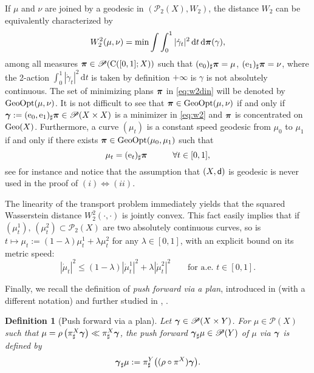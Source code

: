 \documentclass[reqno,11pt]{article}
\numberwithin{equation}{section}
\newcommand{\ggamma}{{\mbox{\boldmath$\gamma$}}}
\newcommand{\ppi}{{\mbox{\boldmath$\pi$}}}
\newcommand{\sfd}{{\sf d}}
\renewcommand{\d}{{\mathrm d}}
\newcommand{\dt}{{\d t}}
\newcommand{\Probabilities}[1]{\mathscr P(#1)}          %
\newcommand{\ProbabilitiesTwo}[1]{\mathscr P_2(#1)}     %
\newtheorem{definition}[theorem]{Definition}
\newcommand{\prob}{\Probabilities}
\newcommand{\probt}{\ProbabilitiesTwo}
\newcommand{\geo}{{\rm{Geo}}}                       %
\newcommand{\e}{{\rm{e}}}                           %
\newcommand{\gopt}{{\rm{GeoOpt}}}                   %
\newcommand{\CC}[2]{\mathrm{C}(#1;#2)}
\begin{document}
If $\mu$ and $\nu$ are joined by a geodesic in $(\probt X,W_2)$, the
distance $W_2$ can be equivalently characterized by
\begin{equation}
\label{eq:w2din} W_2^2(\mu,\nu)=\min\int\int_0^1|\dot\gamma_t|^2\,\d
t\,\d\ppi(\gamma),
\end{equation}
among all measures $\ppi\in\prob{\CC{[0,1]}X}$ such that
$(\e_0)_\sharp \ppi=\mu$, $(\e_1)_\sharp\ppi=\nu$, where the
2-action $\int_0^1|\dot\gamma_t|^2\,\dt$ is taken by definition
$+\infty$ is $\gamma$ is not absolutely continuous. The set of
minimizing plans $\ppi$ in \eqref{eq:w2din} will be denoted by
$\gopt(\mu,\nu)$. It is not difficult to see that
$\ppi\in\gopt(\mu,\nu)$ if and only if
$\ggamma:=(\e_0,\e_1)_\sharp\ppi\in\prob{X\times X}$ is a minimizer
in \eqref{eq:w2} and $\ppi$ is concentrated on $\geo(X)$.
Furthermore, a curve $(\mu_t)$ is a constant speed geodesic from
$\mu_0$ to $\mu_1$ if and only if there exists
$\ppi\in\gopt(\mu_0,\mu_1)$ such that
\[
\mu_t=(\e_t)_\sharp\ppi\qquad\quad\forall t\in [0,1],
\]
see for instance \cite[Theorem~2.10]{Ambrosio-Gigli11} and notice
that the assumption that $(X,\sfd)$ is geodesic is never used in the
proof of $(i)\Leftrightarrow (ii)$.

The linearity of the transport problem immediately yields that the
squared Wasserstein distance $W_2^2(\cdot,\cdot)$ is jointly convex.
This fact easily implies that if $(\mu^1_t),\,(\mu^2_t)\subset\probt
X$ are two absolutely continuous curves, so is
$t\mapsto\mu_t:=(1-\lambda)\mu^1_t+\lambda\mu^2_t$ for any
$\lambda\in [0,1]$, with an explicit bound on its metric speed:
\begin{equation}
\label{eq:convw2}
|\dot\mu_t|^2\leq(1-\lambda)|\dot\mu^1_t|^2+\lambda|\dot\mu^2_t|^2\qquad\text{for
a.e. $t\in [0,1]$.}
\end{equation}

Finally, we recall the definition of \emph{push forward via a plan}, introduced in \cite{Sturm06I}
(with a different notation) and further studied in \cite{Gigli10}, \cite{Ambrosio-Gigli-Savare11}.

\begin{definition}[Push forward via a plan]\label{def:pushplan}
Let $\ggamma\in\prob{X\times Y}$. For $\mu\in\prob X$ such that
$\mu=\rho\,\big(\pi^X_\sharp\ggamma\big)\ll\pi^X_\sharp\ggamma$, the
push forward $\ggamma_\sharp\mu\in\prob Y$ of $\mu$ via $\ggamma$ is
defined by
$$\ggamma_\sharp\mu:=\pi^Y_\sharp\big((\rho\circ\pi^X)\ggamma\big).$$
\end{definition}
\end{document}
